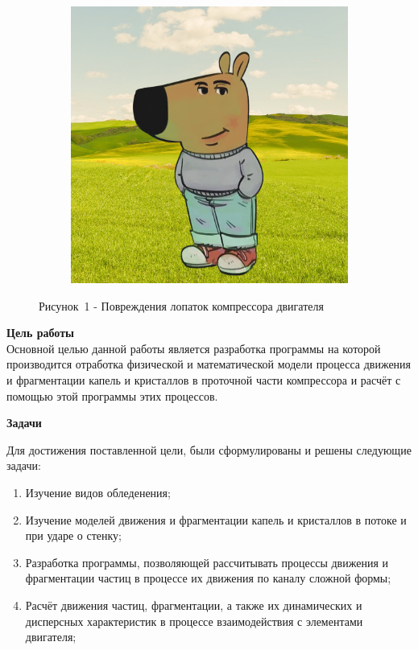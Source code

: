 \begin{figure}[H]
	\vspace{1em}
	
	\begin{subfigure}{0.6\textwidth}
		\centering
		\includegraphics[width=\textwidth]{figures/chill-guy.jpeg}
		\label{fig:pic3}
	\end{subfigure}
	
	\caption*{Рисунок~1 - Повреждения лопаток компрессора двигателя}
	\label{fig:all_pics}
\end{figure}

\textbf{Цель работы}\\
\hspace*{1.25cm}Основной целью данной работы является разработка программы на которой производится отработка физической и математической модели процесса движения и фрагментации капель и кристаллов в проточной части компрессора и расчёт  с помощью этой программы этих процессов.

\textbf{Задачи}

\vspace{0.5em}

Для достижения поставленной цели, были сформулированы и решены следующие задачи:
\begin{enumerate}[label=\arabic*)\hspace{1em}, leftmargin=2cm, itemsep=0em]
	\item Изучение видов обледенения;
	\item Изучение моделей движения и фрагментации капель и кристаллов в потоке и при ударе о стенку;
	\item Разработка программы, позволяющей рассчитывать процессы движения и фрагментации частиц в процессе их движения по каналу сложной формы;
	\item Расчёт движения частиц, фрагментации, а также их динамических и дисперсных характеристик в процессе взаимодействия с элементами двигателя;
\end{enumerate} 